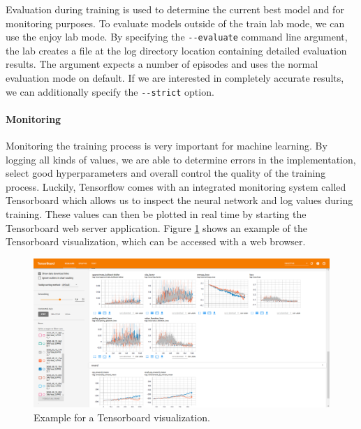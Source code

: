 Evaluation during training is used to determine the current best model and for monitoring purposes. To evaluate models outside of the train lab mode, we can use the enjoy lab mode. By specifying the \texttt{-{}-evaluate} command line argument, the lab creates a file at the log directory location containing detailed evaluation results. The argument expects a number of episodes and uses the normal evaluation mode on default. If we are interested in completely accurate results, we can additionally specify the \texttt{-{}-strict} option. 

\paragraph{Monitoring}
Monitoring the training process is very important for machine learning. By logging all kinds of values, we are able to determine errors in the implementation, select good hyperparameters and overall control the quality of the training process. Luckily, Tensorflow comes with an integrated monitoring system called Tensorboard which allows us to inspect the neural network and log values during training. These values can then be plotted in real time by starting the Tensorboard web server application. Figure \ref{fig:TensorboardExample} shows an example of the Tensorboard visualization, which can be accessed with a web browser.

\begin{figure}[ht]
    
    \begin{center}
        \includegraphics[clip, width=0.95\columnwidth]{figures/implementation/Tensorboard.png}
    \end{center}
    
    \caption[Tensorboard Example]{Example for a Tensorboard visualization.}
    \label{fig:TensorboardExample}
  \end{figure}

